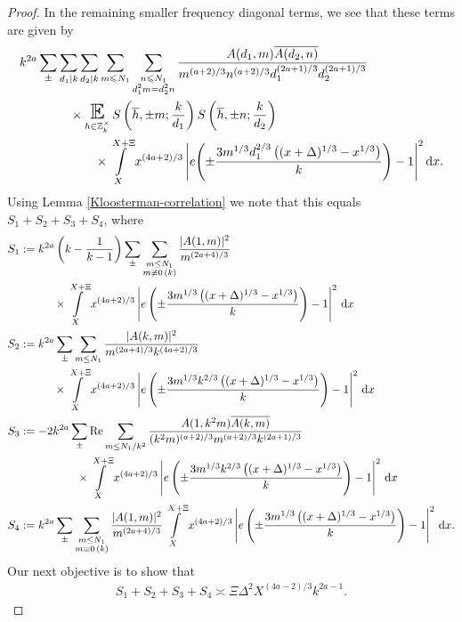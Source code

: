 \documentclass[a4paper,10pt,twoside]{amsart}
\theoremstyle{definition}
\numberwithin{equation}{section}
\newcommand\E{\mathbb{E}}
\renewcommand{\Re}{\textnormal{Re}}
\renewcommand\d{\textnormal{ d}}
\renewcommand\:{\colon}
\begin{document}
\begin{proof}
In the remaining smaller frequency diagonal terms, we see that these terms are given by
\begin{align}\label{short-main-term}        
&k^{2a}\sum_\pm\sum_{d_1|k}\sum_{d_2|k}\sum_{m\leqslant N_1}\sum_{\substack{n\leqslant N_1\\d_1^2m=d_2^2n}}\frac{A(d_1,m)\overline{A(d_2,n)}}{m^{(a+2)/3}n^{(a+2)/3}d_1^{(2a+1)/3}d_2^{(2a+1)/3}}\nonumber \\
&\qquad\qquad\times\mathop{\text{\LARGE$\E$}}_{h\in\mathbb Z_k^\times}S\left(\overline h,\pm m;\frac k{d_1}\right)S\left(\overline h,\pm n;\frac k{d_2}\right) \nonumber\\
&\qquad\qquad\qquad\times\int\limits_X^{X+\Xi}x^{(4a+2)/3}\left|e\!\left(\pm\frac{3m^{1/3}d_1^{2/3}\left((x+\Delta)^{1/3}-x^{1/3}\right)}k\right)-1\right|^2\mathrm dx.
\end{align}    
Using Lemma \ref{Kloosterman-correlation} we note that this equals $S_1+S_2+S_3+S_4$, where
\begin{align*}
&S_1:=k^{2a}\left(k-\frac1{k-1}\right)\sum_\pm\sum_{\substack{m\leq N_1\\
m\not\equiv 0\,(k)}}\frac{|A(1,m)|^2}{m^{(2a+4)/3}}\\
&\qquad\qquad\times\int\limits_X^{X+\Xi}x^{(4a+2)/3}\left|e\left(\pm\frac{3m^{1/3}\left((x+\Delta)^{1/3}-x^{1/3}\right)}k\right)-1\right|^2\,\mathrm d x\\
&S_2:=k^{2a}\sum_\pm\sum_{m\leq N_1}\frac{|A(k,m)|^2}{m^{(2a+4)/3}k^{(4a+2)/3}}\\
&\qquad\qquad\times\int\limits_X^{X+\Xi}x^{(4a+2)/3}\left|e\left(\pm\frac{3m^{1/3}k^{2/3}\left((x+\Delta)^{1/3}-x^{1/3}\right)}k\right)-1\right|^2\,\mathrm d x\\
&S_3:=-2k^{2a}\sum_\pm\Re\sum_{m\leq N_1/k^2}\frac{A(1,k^2m)\overline{A(k,m)}}{(k^2m)^{(a+2)/3}m^{(a+2)/3}k^{(2a+1)/3}}\\
&\qquad\qquad\qquad\times\int\limits_X^{X+\Xi}x^{(4a+2)/3}\left|e\left(\pm\frac{3m^{1/3}k^{2/3}\left((x+\Delta)^{1/3}-x^{1/3}\right)}k\right)-1\right|^2\,\mathrm d x \\
&S_4:=k^{2a}\sum_\pm\sum_{\substack{m\leq N_1\\
m\equiv 0\,(k)}}\frac{|A(1,m)|^2}{m^{(2a+4)/3}}\int\limits_X^{X+\Xi}x^{(4a+2)/3}\left|e\left(\pm\frac{3m^{1/3}\left((x+\Delta)^{1/3}-x^{1/3}\right)}k\right)-1\right|^2\,\mathrm d x.
\end{align*}
Our next objective is to show that 
\begin{align}\label{Estimate-10}
S_1+S_2+S_3+S_4\asymp \Xi\Delta^2 X^{(4a-2)/3}k^{2a-1}.

\end{align}
\end{proof}
\end{document}
